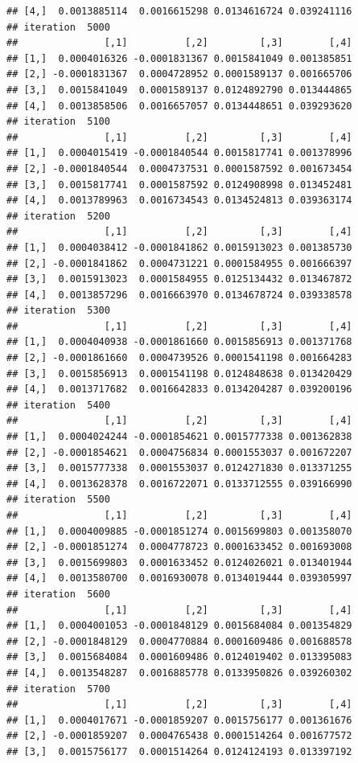 \documentclass[
]{article}
\begin{document}
\begin{verbatim}
## [4,]  0.0013885114  0.0016615298 0.0134616724 0.039241116
## iteration  5000 
##               [,1]          [,2]         [,3]        [,4]
## [1,]  0.0004016326 -0.0001831367 0.0015841049 0.001385851
## [2,] -0.0001831367  0.0004728952 0.0001589137 0.001665706
## [3,]  0.0015841049  0.0001589137 0.0124892790 0.013444865
## [4,]  0.0013858506  0.0016657057 0.0134448651 0.039293620
## iteration  5100 
##               [,1]          [,2]         [,3]        [,4]
## [1,]  0.0004015419 -0.0001840544 0.0015817741 0.001378996
## [2,] -0.0001840544  0.0004737531 0.0001587592 0.001673454
## [3,]  0.0015817741  0.0001587592 0.0124908998 0.013452481
## [4,]  0.0013789963  0.0016734543 0.0134524813 0.039363174
## iteration  5200 
##               [,1]          [,2]         [,3]        [,4]
## [1,]  0.0004038412 -0.0001841862 0.0015913023 0.001385730
## [2,] -0.0001841862  0.0004731221 0.0001584955 0.001666397
## [3,]  0.0015913023  0.0001584955 0.0125134432 0.013467872
## [4,]  0.0013857296  0.0016663970 0.0134678724 0.039338578
## iteration  5300 
##               [,1]          [,2]         [,3]        [,4]
## [1,]  0.0004040938 -0.0001861660 0.0015856913 0.001371768
## [2,] -0.0001861660  0.0004739526 0.0001541198 0.001664283
## [3,]  0.0015856913  0.0001541198 0.0124848638 0.013420429
## [4,]  0.0013717682  0.0016642833 0.0134204287 0.039200196
## iteration  5400 
##               [,1]          [,2]         [,3]        [,4]
## [1,]  0.0004024244 -0.0001854621 0.0015777338 0.001362838
## [2,] -0.0001854621  0.0004756834 0.0001553037 0.001672207
## [3,]  0.0015777338  0.0001553037 0.0124271830 0.013371255
## [4,]  0.0013628378  0.0016722071 0.0133712555 0.039166990
## iteration  5500 
##               [,1]          [,2]         [,3]        [,4]
## [1,]  0.0004009885 -0.0001851274 0.0015699803 0.001358070
## [2,] -0.0001851274  0.0004778723 0.0001633452 0.001693008
## [3,]  0.0015699803  0.0001633452 0.0124026021 0.013401944
## [4,]  0.0013580700  0.0016930078 0.0134019444 0.039305997
## iteration  5600 
##               [,1]          [,2]         [,3]        [,4]
## [1,]  0.0004001053 -0.0001848129 0.0015684084 0.001354829
## [2,] -0.0001848129  0.0004770884 0.0001609486 0.001688578
## [3,]  0.0015684084  0.0001609486 0.0124019402 0.013395083
## [4,]  0.0013548287  0.0016885778 0.0133950826 0.039260302
## iteration  5700 
##               [,1]          [,2]         [,3]        [,4]
## [1,]  0.0004017671 -0.0001859207 0.0015756177 0.001361676
## [2,] -0.0001859207  0.0004765438 0.0001514264 0.001677572
## [3,]  0.0015756177  0.0001514264 0.0124124193 0.013397192

\end{verbatim}
\end{document}

